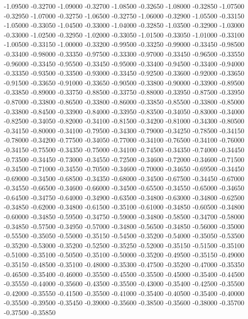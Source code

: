 {-1.09500 -0.32700
-1.09000 -0.32700
-1.08500 -0.32650
-1.08000 -0.32850
-1.07500 -0.32950
-1.07000 -0.32750
-1.06500 -0.32750
-1.06000 -0.32900
-1.05500 -0.33150
-1.05000 -0.33050
-1.04500 -0.33000
-1.04000 -0.32850
-1.03500 -0.32900
-1.03000 -0.33000
-1.02500 -0.32950
-1.02000 -0.33050
-1.01500 -0.33050
-1.01000 -0.33100
-1.00500 -0.33150
-1.00000 -0.33200
-0.99500 -0.33250
-0.99000 -0.33450
-0.98500 -0.33400
-0.98000 -0.33350
-0.97500 -0.33300
-0.97000 -0.33450
-0.96500 -0.33550
-0.96000 -0.33450
-0.95500 -0.33450
-0.95000 -0.33400
-0.94500 -0.33400
-0.94000 -0.33350
-0.93500 -0.33500
-0.93000 -0.33450
-0.92500 -0.33600
-0.92000 -0.33650
-0.91500 -0.33650
-0.91000 -0.33650
-0.90500 -0.33800
-0.90000 -0.33900
-0.89500 -0.33850
-0.89000 -0.33750
-0.88500 -0.33750
-0.88000 -0.33950
-0.87500 -0.33950
-0.87000 -0.33800
-0.86500 -0.33800
-0.86000 -0.33850
-0.85500 -0.33800
-0.85000 -0.33800
-0.84500 -0.33900
-0.84000 -0.33950
-0.83500 -0.34050
-0.83000 -0.34000
-0.82500 -0.34050
-0.82000 -0.34100
-0.81500 -0.34200
-0.81000 -0.34300
-0.80500 -0.34150
-0.80000 -0.34100
-0.79500 -0.34300
-0.79000 -0.34250
-0.78500 -0.34150
-0.78000 -0.34200
-0.77500 -0.34050
-0.77000 -0.34100
-0.76500 -0.34100
-0.76000 -0.34150
-0.75500 -0.34350
-0.75000 -0.34100
-0.74500 -0.34350
-0.74000 -0.34450
-0.73500 -0.34450
-0.73000 -0.34550
-0.72500 -0.34600
-0.72000 -0.34600
-0.71500 -0.34500
-0.71000 -0.34550
-0.70500 -0.34600
-0.70000 -0.34650
-0.69500 -0.34450
-0.69000 -0.34500
-0.68500 -0.34350
-0.68000 -0.34500
-0.67500 -0.34450
-0.67000 -0.34550
-0.66500 -0.34600
-0.66000 -0.34500
-0.65500 -0.34550
-0.65000 -0.34650
-0.64500 -0.34750
-0.64000 -0.34900
-0.63500 -0.34800
-0.63000 -0.34800
-0.62500 -0.34850
-0.62000 -0.34800
-0.61500 -0.35100
-0.61000 -0.34850
-0.60500 -0.34800
-0.60000 -0.34850
-0.59500 -0.34750
-0.59000 -0.34800
-0.58500 -0.34700
-0.58000 -0.34850
-0.57500 -0.34950
-0.57000 -0.34800
-0.56500 -0.34850
-0.56000 -0.35000
-0.55500 -0.35050
-0.55000 -0.35150
-0.54500 -0.35200
-0.54000 -0.35050
-0.53500 -0.35200
-0.53000 -0.35200
-0.52500 -0.35250
-0.52000 -0.35150
-0.51500 -0.35100
-0.51000 -0.35100
-0.50500 -0.35100
-0.50000 -0.35200
-0.49500 -0.35150
-0.49000 -0.35150
-0.48500 -0.35100
-0.48000 -0.35300
-0.47500 -0.35200
-0.47000 -0.35350
-0.46500 -0.35400
-0.46000 -0.35500
-0.45500 -0.35500
-0.45000 -0.35400
-0.44500 -0.35550
-0.44000 -0.35600
-0.43500 -0.35500
-0.43000 -0.35400
-0.42500 -0.35500
-0.42000 -0.35550
-0.41500 -0.35500
-0.41000 -0.35400
-0.40500 -0.35400
-0.40000 -0.35500
-0.39500 -0.35450
-0.39000 -0.35600
-0.38500 -0.35600
-0.38000 -0.35700
-0.37500 -0.35850
}
